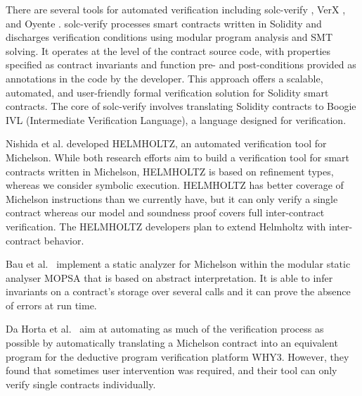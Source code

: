 There are several tools for automated verification including
solc-verify \cite{solc}, VerX \cite{verx}, and Oyente
\cite{oyente}. solc-verify processes smart contracts written in
Solidity and discharges verification conditions using modular program
analysis and SMT solving. It operates at the level of the contract
source code, with properties specified as contract invariants and
function pre- and post-conditions provided as annotations in the code
by the developer. This approach offers a scalable, automated, and
user-friendly formal verification solution for Solidity smart
contracts. The core of solc-verify involves translating Solidity
contracts to Boogie IVL (Intermediate Verification Language), a
language designed for verification.  

Nishida et al. \cite{helmholtz} developed HELMHOLTZ, an automated
verification tool for Michelson. While both research efforts aim to
build a verification tool for smart contracts written in Michelson,
HELMHOLTZ is based on  refinement types, whereas we consider symbolic
execution.
HELMHOLTZ has better coverage of Michelson instructions than we
currently have, but it can only verify a single contract whereas our
model and soundness proof covers full inter-contract verification.
The HELMHOLTZ developers plan to extend Helmholtz with inter-contract behavior.




Bau et al.~\cite{abstract-interpretation} implement a static analyzer for Michelson
within the modular static analyser MOPSA that is based on abstract interpretation.
It is able to infer invariants on a contract's storage over several calls
and it can prove the absence of errors at run time.

Da Horta et al.~\cite{WHYtool} aim at automating as much of the verification process as possible
by automatically translating a Michelson contract into an equivalent program
for the deductive program verification platform WHY3.
However, they found that sometimes user intervention was required,
and their tool can only verify single contracts individually.


